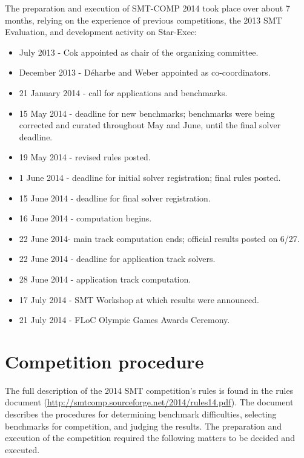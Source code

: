\documentclass[twosize,11pt]{article}
\begin{document}
The preparation and execution of SMT-COMP 2014 took place over about 7 months, relying on the experience of previous competitions, the 2013 SMT Evaluation, and development activity on Star-Exec:
\begin{itemize}
\item July 2013 - Cok appointed as chair of the organizing committee.
\item December 2013 - D\'{e}harbe and Weber appointed as co-coordinators.
\item 21 January 2014 - call for applications and benchmarks.
\item 15 May 2014 - deadline for new benchmarks; benchmarks were being corrected and curated throughout May and June, until the final solver deadline.
\item 19 May 2014 - revised rules posted.
\item 1 June 2014 - deadline for initial solver registration; final rules posted.
\item 15 June 2014 - deadline for final solver registration.
\item 16 June 2014 - computation begins.
\item 22 June 2014- main track computation ends; official results posted on 6/27. 
\item 22 June 2014 - deadline for application track solvers.
\item 28 June 2014 - application track computation.
\item 17 July 2014 - SMT Workshop at which results were announced.
\item 21 July 2014 - FLoC Olympic Games Awards Ceremony.
\end{itemize}

\section{Competition procedure} 
\label{sec:procedure}


The full description of the 2014 SMT competition's rules is found in the rules document (\url{http://smtcomp.sourceforge.net/2014/rules14.pdf}). The document describes the procedures for determining benchmark difficulties, selecting benchmarks for competition, and judging the results. The preparation and execution of the competition required the following matters to be decided and executed.
\end{document}

